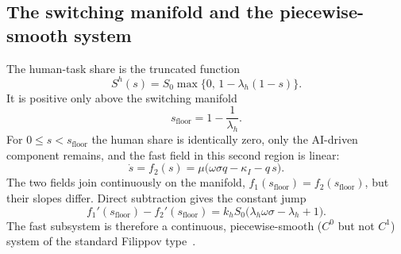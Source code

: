 \documentclass[review,12pt]{elsarticle}
\theoremstyle{plain}
\theoremstyle{definition}
\theoremstyle{remark}
\begin{document}
\subsection{The switching manifold and the piecewise-smooth system}
The human-task share is the truncated function
\begin{equation}
S^h(s)=S_0\max\!\bigl\{0,\,1-\lambda_h(1-s)\bigr\}.
\label{eq:bif-Sh}
\end{equation}
It is positive only above the switching manifold
\begin{equation}
s_{\text{floor}}=1-\frac1{\lambda_h}.
\label{eq:bif-sfloor}
\end{equation}
For $0\le s<s_{\text{floor}}$ the human share is identically zero, only the AI-driven component remains, and the fast field in this second region is linear:
\begin{equation}
\dot s=f_2(s)=\mu\bigl(\omega\sigma q-\kappa_I-q\,s\bigr).
\label{eq:bif-f2}
\end{equation}
The two fields join continuously on the manifold, $f_1(s_{\text{floor}})=f_2(s_{\text{floor}})$, but their slopes differ. Direct subtraction gives the constant jump
\begin{equation}
f_1'(s_{\text{floor}})-f_2'(s_{\text{floor}})
=k_hS_0\bigl(\lambda_h\omega\sigma-\lambda_h+1\bigr).
\label{eq:bif-jump}
\end{equation}
The fast subsystem is therefore a continuous, piecewise-smooth ($C^0$ but not $C^1$) system of the standard Filippov type~\citep{diBernardo2008}.
\end{document}
